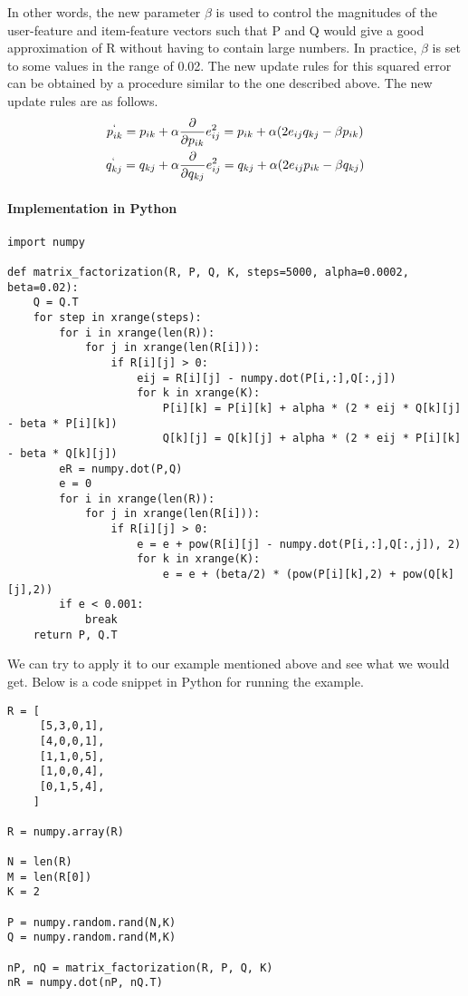  In other words, the new parameter $\beta$ is used to control the magnitudes of the user-feature and item-feature vectors such that P and Q would give a good approximation of R without having to contain large numbers. In practice, $\beta$ is set to some values in the range of 0.02. The new update rules for this squared error can be obtained by a procedure similar to the one described above. The new update rules are as follows.
\begin{gather*}
      p^`_{ik} = p_{ik} + \alpha\frac{\partial}{\partial p_{ik}}e_{ij}^2 = p_{ik} + \alpha(2e_{ij}q_{kj} - \beta p_{ik}) \\
      q^`_{kj} = q_{kj} + \alpha\frac{\partial}{\partial q_{kj}}e_{ij}^2 = q_{kj} + \alpha(2e_{ij}p_{ik} - \beta q_{kj})
  \end{gather*}
\paragraph{Implementation in Python}
\begin{lstlisting}
import numpy

def matrix_factorization(R, P, Q, K, steps=5000, alpha=0.0002, beta=0.02):
    Q = Q.T
    for step in xrange(steps):
        for i in xrange(len(R)):
            for j in xrange(len(R[i])):
                if R[i][j] > 0:
                    eij = R[i][j] - numpy.dot(P[i,:],Q[:,j])
                    for k in xrange(K):
                        P[i][k] = P[i][k] + alpha * (2 * eij * Q[k][j] - beta * P[i][k])
                        Q[k][j] = Q[k][j] + alpha * (2 * eij * P[i][k] - beta * Q[k][j])
        eR = numpy.dot(P,Q)
        e = 0
        for i in xrange(len(R)):
            for j in xrange(len(R[i])):
                if R[i][j] > 0:
                    e = e + pow(R[i][j] - numpy.dot(P[i,:],Q[:,j]), 2)
                    for k in xrange(K):
                        e = e + (beta/2) * (pow(P[i][k],2) + pow(Q[k][j],2))
        if e < 0.001:
            break
    return P, Q.T
\end{lstlisting}

 We can try to apply it to our example mentioned above and see what we would get. Below is a code snippet in Python for running the example.
\begin{lstlisting}
R = [
     [5,3,0,1],
     [4,0,0,1],
     [1,1,0,5],
     [1,0,0,4],
     [0,1,5,4],
    ]

R = numpy.array(R)

N = len(R)
M = len(R[0])
K = 2

P = numpy.random.rand(N,K)
Q = numpy.random.rand(M,K)

nP, nQ = matrix_factorization(R, P, Q, K)
nR = numpy.dot(nP, nQ.T)
\end{lstlisting}

